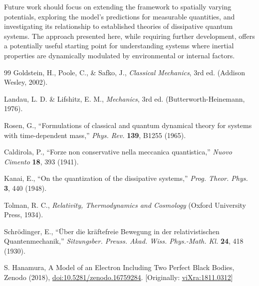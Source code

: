 \documentclass[%
 reprint,
 amsmath,amssymb,
 aps,
]{revtex4-1}
\numberwithin{equation}{section}%
\begin{document}
Future work should focus on extending the framework to spatially varying potentials, exploring the model's predictions for measurable quantities, and investigating its relationship to established theories of dissipative quantum systems. The approach presented here, while requiring further development, offers a potentially useful starting point for understanding systems where inertial properties are dynamically modulated by environmental or internal factors.

\begin{thebibliography}{99}
 Goldstein, H., Poole, C., \& Safko, J.,
\textit{Classical Mechanics}, 3rd ed. (Addison Wesley, 2002).

 Landau, L. D. \& Lifshitz, E. M.,
\textit{Mechanics}, 3rd ed. (Butterworth-Heinemann, 1976).

 Rosen, G.,
``Formulations of classical and quantum dynamical theory for systems with time-dependent mass,''
\textit{Phys. Rev.} \textbf{139}, B1255 (1965).

 Caldirola, P.,
``Forze non conservative nella meccanica quantistica,''
\textit{Nuovo Cimento} \textbf{18}, 393 (1941).

 Kanai, E.,
``On the quantization of the dissipative systems,''
\textit{Prog. Theor. Phys.} \textbf{3}, 440 (1948).

 Tolman, R. C.,
\textit{Relativity, Thermodynamics and Cosmology} (Oxford University Press, 1934).

 Schrödinger, E.,
``Über die kräftefreie Bewegung in der relativistischen Quantenmechanik,''
\textit{Sitzungsber. Preuss. Akad. Wiss. Phys.-Math. Kl.} \textbf{24}, 418 (1930).

S. Hanamura, A Model of an Electron Including Two Perfect Black Bodies, Zenodo (2018), \href{https://doi.org/10.5281/zenodo.16759284}{doi:10.5281/zenodo.16759284}. [Originally: \href{https://vixra.org/abs/1811.0312}{viXra:1811.0312}]


\end{thebibliography}
\end{document}
